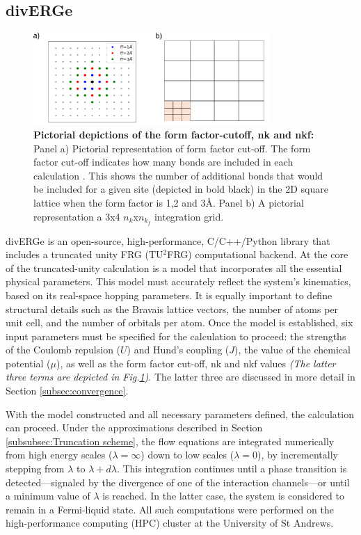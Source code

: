 \documentclass[12pt]{article}
\begin{document}
\subsection{divERGe}
\label{subsec:diverge}

\begin{figure}[htbp]  %
    \centering
    \includegraphics[width=0.8\textwidth]{nknkfff.png}  %
    \caption{\textbf{Pictorial depictions of the form factor-cutoff, nk and nkf:} Panel a)
    Pictorial representation of form factor cut-off. 
    The form factor cut-off indicates how many bonds are included in each calculation .
    This shows the number of additional bonds
    that would be included for a given site (depicted in bold black) in the 2D 
    square lattice when the form factor is 1,2 and 3\AA. 
    Panel b) A pictorial representation a 3x4 $n_k$x$n_{k_f}$ integration grid.  }
    \label{fig:nknkf}
\end{figure}


\noindent divERGe is an open-source, high-performance, C/C++/Python library that includes a truncated unity FRG (TU$^2$FRG) computational backend\cite{profe2024diverge}. 
At the core of the truncated-unity calculation is a model that incorporates all the essential physical parameters. This model must accurately reflect the system's kinematics, based on its real-space hopping parameters.
It is equally important to define structural details such as the Bravais lattice vectors, the number of atoms per unit cell, 
and the number of orbitals per atom. Once the model is established, six input parameters must be specified for the calculation to proceed: 
the strengths of the Coulomb repulsion ($U$) and Hund’s coupling ($J$), the value of the chemical potential ($\mu$), as well as the form factor cut-off, nk and nkf
values \textit{(The latter three terms are depicted in Fig.\ref{fig:nknkf})}. The latter three are discussed in more detail in Section \ref{subsec:convergence}.\par
\medskip
\noindent With the model constructed and all necessary parameters defined, 
the calculation can proceed. Under the approximations described in Section \ref{subsubsec:Truncation scheme},
the flow equations are integrated numerically from high energy scales ($\lambda = \infty$) down to low scales ($\lambda = 0$), 
by incrementally stepping from $\lambda$ to $\lambda + d\lambda$. This integration continues until a phase transition is detected—signaled 
by the divergence of one of the interaction channels—or until a minimum value of $\lambda$ is reached. In the latter case, the system is considered to remain 
in a Fermi-liquid state. All such computations were performed on the high-performance computing (HPC) cluster at the University of St Andrews.
\end{document}
